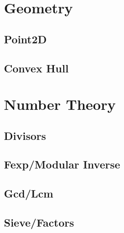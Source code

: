 \section{Geometry}
\subsection{Point2D}
\raggedbottom
\vspace{-.7\baselineskip}\hrulefill
\vspace{0.1\baselineskip}\subsection{Convex Hull}
\raggedbottom
\vspace{-.7\baselineskip}\hrulefill
\vspace{0.1\baselineskip}
\section{Number Theory}
\subsection{Divisors}
\raggedbottom
\vspace{-.7\baselineskip}\hrulefill
\vspace{0.1\baselineskip}\subsection{Fexp/Modular Inverse}
\raggedbottom
\vspace{-.7\baselineskip}\hrulefill
\vspace{0.1\baselineskip}\subsection{Gcd/Lcm}
\raggedbottom
\vspace{-.7\baselineskip}\hrulefill
\vspace{0.1\baselineskip}\subsection{Sieve/Factors}
\raggedbottom
\vspace{-.7\baselineskip}\hrulefill
\vspace{0.1\baselineskip}
